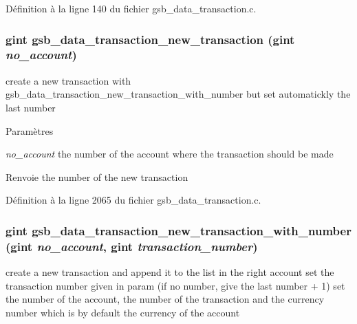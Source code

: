 Définition à la ligne 140 du fichier gsb\_\-data\_\-transaction.c.

\subsubsection[{gsb\_\-data\_\-transaction\_\-new\_\-transaction}]{\setlength{\rightskip}{0pt plus 5cm}gint gsb\_\-data\_\-transaction\_\-new\_\-transaction (gint {\em no\_\-account})}\label{gsb__data__transaction_8c_af65a20fc0270cbfbc5d69f5d55da8112}
create a new transaction with gsb\_\-data\_\-transaction\_\-new\_\-transaction\_\-with\_\-number but set automatickly the last number


\begin{DoxyParams}{Paramètres}
\item[{\em no\_\-account}]the number of the account where the transaction should be made\end{DoxyParams}
\begin{DoxyReturn}{Renvoie}
the number of the new transaction 
\end{DoxyReturn}


Définition à la ligne 2065 du fichier gsb\_\-data\_\-transaction.c.

\subsubsection[{gsb\_\-data\_\-transaction\_\-new\_\-transaction\_\-with\_\-number}]{\setlength{\rightskip}{0pt plus 5cm}gint gsb\_\-data\_\-transaction\_\-new\_\-transaction\_\-with\_\-number (gint {\em no\_\-account}, \/  gint {\em transaction\_\-number})}\label{gsb__data__transaction_8c_afc9fc27f5219a49d80fb0922c904439d}
create a new transaction and append it to the list in the right account set the transaction number given in param (if no number, give the last number + 1) set the number of the account, the number of the transaction and the currency number which is by default the currency of the account


